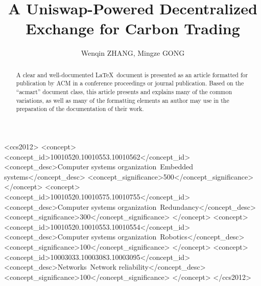 \documentclass[sigconf, authordraft]{acmart}
\begin{document}
	\title{A Uniswap-Powered Decentralized Exchange for Carbon Trading}


	\author{Wenqin ZHANG, Mingze GONG}


	\renewcommand{\shortauthors}{Trovato and Tobin, et al.}


	\begin{abstract}
		A clear and well-documented \LaTeX\ document is presented as an article formatted
		for publication by ACM in a conference proceedings or journal publication.
		Based on the ``acmart'' document class, this article presents and explains many
		of the common variations, as well as many of the formatting elements an
		author may use in the preparation of the documentation of their work.
	\end{abstract}

	\begin{CCSXML}
		<ccs2012> <concept> <concept_id>10010520.10010553.10010562</concept_id> <concept_desc>Computer
		systems organization~Embedded systems</concept_desc> <concept_significance>500</concept_significance>
		</concept> <concept> <concept_id>10010520.10010575.10010755</concept_id> <concept_desc>Computer
		systems organization~Redundancy</concept_desc> <concept_significance>300</concept_significance>
		</concept> <concept> <concept_id>10010520.10010553.10010554</concept_id> <concept_desc>Computer
		systems organization~Robotics</concept_desc> <concept_significance>100</concept_significance>
		</concept> <concept> <concept_id>10003033.10003083.10003095</concept_id> <concept_desc>Networks~Network
		reliability</concept_desc> <concept_significance>100</concept_significance>
		</concept> </ccs2012>
	\end{CCSXML}
\end{document}
